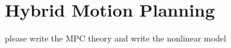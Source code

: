 \section{Hybrid Motion Planning}
\label{sec:review}
{\color{red} please write the MPC theory and write the nonlinear model}